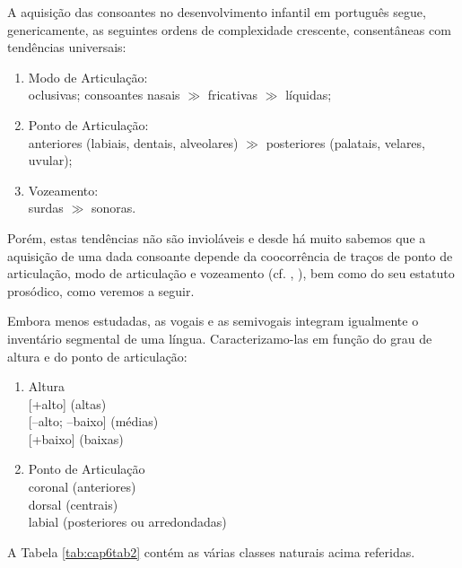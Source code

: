 \documentclass[output=paper,colorlinks,citecolor=brown,booklanguage=portuguese]{langscibook}
\begin{document}
A aquisição das consoantes no desenvolvimento infantil em português segue, genericamente, as seguintes ordens de complexidade crescente, consentâneas com tendências universais: 

\begin{enumerate}[label=(\roman*)]
\item Modo de Articulação:\\
    oclusivas; consoantes nasais $\gg$ fricativas $\gg$ líquidas;
\item  Ponto de Articulação: \\
    anteriores (labiais, dentais, alveolares) $\gg$ posteriores (palatais, velares, uvular);
\item Vozeamento:\\
    surdas $\gg$ sonoras.
\end{enumerate}

Porém, estas tendências não são invioláveis e desde há muito sabemos que a aquisição de uma dada consoante depende da coocorrência de traços de ponto de articulação, modo de articulação e vozeamento (cf. , ), bem como do seu estatuto prosódico, como veremos a seguir.

Embora menos estudadas, as vogais e as semivogais integram igualmente o inventário segmental de uma língua. Caracterizamo-las em função do grau de altura e do ponto de articulação:


\begin{enumerate}[label=(\roman*)]
\item Altura\\
    {[+alto]} (altas)\\
    {[$–$alto; $–$baixo]} (médias)\\
    {[+baixo]} (baixas)
\item Ponto de Articulação\\
    coronal (anteriores)\\
    dorsal (centrais)\\
    labial (posteriores ou arredondadas)
\end{enumerate}

A Tabela \ref{tab:cap6tab2} contém as várias classes naturais acima referidas.
\end{document}
